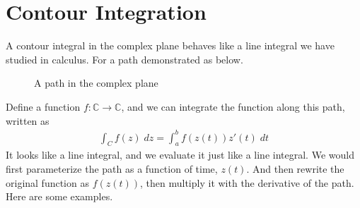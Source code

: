 \documentclass[12pt]{book}
\newcommand{\C}{\mathbb{C}}
\newcommand{\paren}[1]{\left( #1 \right)}
\begin{document}
\section{Contour Integration}
A contour integral in the complex plane behaves like a line integral we have studied in calculus. For a path demonstrated as below.
\begin{figure}[!h]
    \centering

    \caption{A path in the complex plane}
    \label{fig:3.3}
\end{figure}
Define a function $f \colon \C \to \C$, and we can integrate the function along this path, written as
\begin{align}
    \int_C f(z) \; dz = \int_{a}^{b} f\paren{z(t)}z'\paren{t}\;dt
\end{align}
It looks like a line integral, and we evaluate it just like a line integral. We would first parameterize the path as a function of time, $z(t)$. And then rewrite the original function as $f\paren{z(t)}$, then multiply it with the derivative of the path. Here are some examples.
\end{document}
